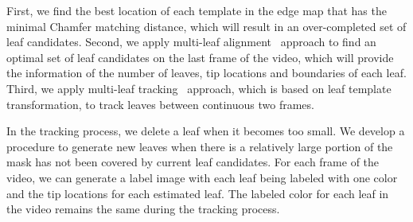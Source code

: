 First, we find the best location of each template in the edge map that has the minimal Chamfer matching distance, which will result in an over-completed set of leaf candidates.
Second, we apply multi-leaf alignment~\cite{yin2014a} approach to find an optimal set of leaf candidates on the last frame of the video, which will provide the information of the number of leaves, tip locations and boundaries of each leaf.
Third, we apply multi-leaf tracking~\cite{yin2014b} approach, which is based on leaf template transformation, to track leaves between continuous two frames.

In the tracking process, we delete a leaf when it becomes too small.
We develop a procedure to generate new leaves when there is a relatively large portion of the mask has not been covered by current leaf candidates.
For each frame of the video, we can generate a label image with each leaf being labeled with one color and the tip locations for each estimated leaf.
The labeled color for each leaf in the video remains the same during the tracking process.


